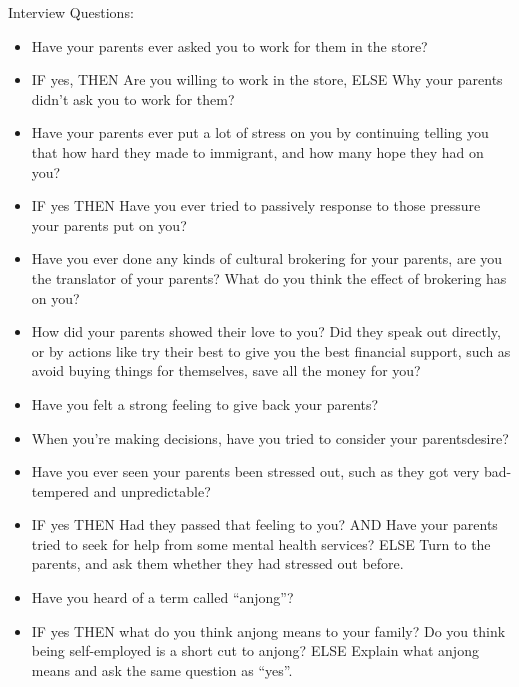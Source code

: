 Interview Questions:
\begin{itemize}
  \item Have your parents ever asked you to work for them in the store?
  \item IF yes, THEN Are you willing to work in the store, ELSE Why your parents
  didn't ask you to work for them?
  \item Have your parents ever put a lot of stress on you by continuing telling
  you that how hard they made to immigrant, and how many hope they had on you?
  \item IF yes THEN Have you ever tried to passively response to those pressure
  your parents put on you?
  \item Have you ever done any kinds of cultural brokering for your parents,
  are you the translator of your parents? What do you think the effect of brokering has on you?
  \item How did your parents showed their love to you? Did they speak out
  directly, or by actions like try their best to give you the best financial support, 
  such as avoid buying things for themselves, save all the money for you?
  \item Have you felt a strong feeling to give back your parents?
  \item When you're making decisions, have you tried to consider your
  parentsdesire?
  \item Have you ever seen your parents been stressed out, such as they got very
  bad-tempered and unpredictable?
  \item IF yes THEN Had they passed that feeling to you? AND Have your parents
  tried to seek for help from some mental health services? ELSE Turn to the
  parents, and ask them whether they had stressed out before.
  \item Have you heard of a term called ``anjong''\cite[p.~41]{book:ISelected}? 
  \item IF yes THEN what do you think anjong means to your family? Do you think
  being self-employed is a short cut to anjong? ELSE Explain what anjong means
  and ask the same question as ``yes''.
\end{itemize}
